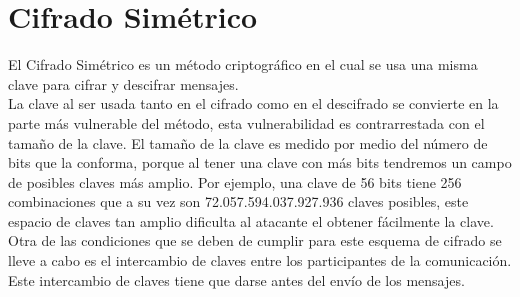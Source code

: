 \documentclass[12pt,oneside,onecolumn,openany]{report}
\begin{document}
\section{Cifrado Simétrico}
El Cifrado Simétrico es un método criptográfico en el cual se usa una misma clave para cifrar y descifrar mensajes.\\
La clave al  ser usada tanto en el cifrado como en el descifrado se convierte en  la parte más  vulnerable  del  método,  esta  vulnerabilidad  es  contrarrestada  con  el  tamaño  de  la 
clave. El tamaño de la clave es medido por medio del número de bits que la conforma, porque  al  tener  una  clave  con  más  bits  tendremos  un  campo  de  posibles  claves  más 
amplio.  Por  ejemplo,  una  clave  de  56  bits  tiene  256  combinaciones  que  a  su  vez  son 72.057.594.037.927.936  claves  posibles,  este  espacio  de  claves  tan  amplio  dificulta  al 
atacante el obtener fácilmente la clave.\\
Otra de las condiciones que se deben de cumplir para este esquema de cifrado se lleve a cabo  es  el  intercambio  de  claves  entre  los  participantes  de  la  comunicación.  Este intercambio de claves tiene que darse antes del envío de los mensajes.
\end{document}
